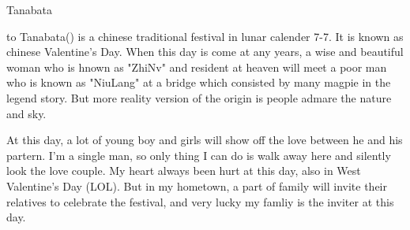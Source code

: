 \begin{writing}[18-8-17]{Tanabata}

\noindent\hbox to
\indent Tanabata() is a chinese traditional festival in lunar calender 7-7.
It is known as chinese Valentine's Day. When this day is come at any years, a wise and beautiful 
woman who is hnown as "ZhiNv" and resident at heaven will meet a poor man who is known as "NiuLang"
at a bridge which consisted by many magpie in the legend story. But more reality version of the origin
is people admare the nature and sky.

At this day, a lot of young boy and girls will show off the love between he and his partern. I'm a single
man, so only thing I can do is walk away here and silently look the love couple. My heart always 
been hurt at this day, also in West Valentine's Day (LOL). But in my hometown, a part of family will
invite their relatives to celebrate the festival, and very lucky my famliy is the inviter at this day.

\end{writing}

